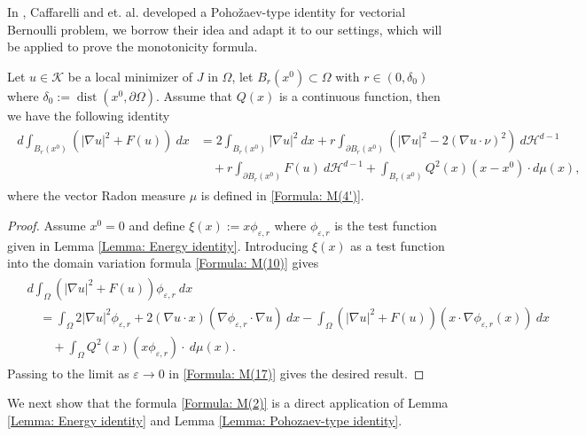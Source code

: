 \documentclass[11pt,reqno]{amsart}
\begin{document}
In \cite{CSY2018}, Caffarelli and et. al. developed a Poho\v{z}aev-type identity for vectorial Bernoulli problem, we borrow their idea and adapt it to our settings, which will be applied to prove the monotonicity formula.
\begin{lemma}\label{Lemma: Pohozaev-type identity}
	Let $u\in\mathcal{K}$ be a local minimizer of $J$ in $\Omega$, let $B_{r}(x^{0})\subset\Omega$ with $r\in(0,\delta_{0})$ where $\delta_{0}:=\operatorname{dist}(x^{0},\partial\Omega)$. Assume that $Q(x)$ is a continuous function, then we have the following identity
	\begin{align}\label{Formula: M(16)}
		\begin{alignedat}{2}
			d\int_{B_{r}(x^{0})}(|\nabla u|^{2}+F(u))\:dx&=2\int_{B_{r}(x^{0})}|\nabla u|^{2}\:dx+r\int_{\partial B_{r}(x^{0})}(|\nabla u|^{2}-2(\nabla u\cdot\nu)^{2})\:d\mathcal{H}^{d-1}\\
			&\quad+r\int_{\partial B_{r}(x^{0})}F(u)\:d\mathcal{H}^{d-1}+\int_{B_{r}(x^{0})}Q^{2}(x)(x-x^{0})\cdot d\mu(x),
		\end{alignedat}
	\end{align}
	where the vector Radon measure $\mu$ is defined in \eqref{Formula: M(4')}.
\end{lemma}
\begin{proof}
	Assume $x^{0}=0$ and define $\xi(x):=x\phi_{\varepsilon,r}$ where $\phi_{\varepsilon,r}$ is the test function given in Lemma \ref{Lemma: Energy identity}. Introducing $\xi(x)$ as a test function into the domain variation formula \eqref{Formula: M(10)} gives
	\begin{align}\label{Formula: M(17)}
		\begin{alignedat}{3}
			&d\int_{\Omega}(|\nabla u|^{2}+F(u))\phi_{\varepsilon,r}\:dx\\
			&\quad=\int_{\Omega}2|\nabla u|^{2}\phi_{\varepsilon,r}+2(\nabla u\cdot x)(\nabla\phi_{\varepsilon,r}\cdot\nabla u)\:dx-\int_{\Omega}(|\nabla u|^{2}+F(u))(x\cdot\nabla\phi_{\varepsilon,r}(x))\:dx\\
			&\qquad+\int_{\Omega}Q^{2}(x)(x\phi_{\varepsilon,r})\cdot\:d\mu(x).
		\end{alignedat}
	\end{align}
    Passing to the limit as $\varepsilon\to0$ in \eqref{Formula: M(17)} gives the desired result.
\end{proof}
We next show that the formula \eqref{Formula: M(2)} is a direct application of Lemma \ref{Lemma: Energy identity} and Lemma \ref{Lemma: Pohozaev-type identity}.
\end{document}

